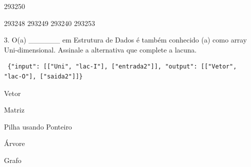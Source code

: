 \documentclass[10pt,brazil,a4paper]{exam}
\begin{document}
\begin{oneparchoices}
\choice {}293250

\choice {}\hspace{2.0mm}293248
\choice {}\hspace{2.0mm}293249
\choice {}\hspace{2.0mm}293240
\choice {}\hspace{2.0mm}293253
\end{oneparchoices}\vspace{1mm}



 \hspace{0mm} 3. %
O(a) \_\_\_\_\_\_ em Estrutura de Dados é também conhecido (a) como array Uni-dimensional. Assinale a alternativa que complete a lacuna.

\begin{verbatim}
 {"input": [["Uni", "lac-I"], ["entrada2"]], "output": [["Vetor", "lac-O"], ["saida2"]]}
\end{verbatim}

\vspace{0mm}

\begin{oneparchoices}
\choice {}Vetor

\choice {}\hspace{2.0mm}Matriz

\choice {}\hspace{2.0mm}Pilha usando Ponteiro

\choice {}\hspace{2.0mm}Árvore

\choice {}\hspace{2.0mm}Grafo

\end{oneparchoices}\vspace{1mm}
\end{document}
